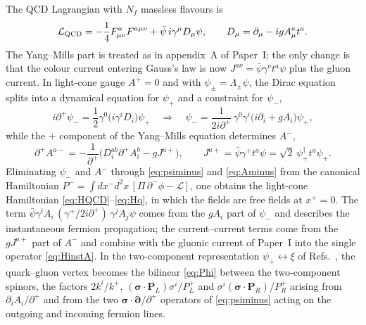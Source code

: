 \documentclass[11pt,a4paper]{article}
\numberwithin{equation}{section}
\newcommand{\dg}{\dagger}
\newcommand{\Nf}{N_{f}}
\begin{document}
The QCD Lagrangian with $\Nf$ massless flavours is
\begin{equation}
\mathcal L_{\rm QCD}=-\frac14F^{a}_{\mu\nu}F^{a\mu\nu}+\bar\psi\,i\gamma^{\mu}D_{\mu}\psi,
\qquad D_{\mu}=\partial_{\mu}-igA^{a}_{\mu}t^{a}.
\label{eq:LQCD}
\end{equation}
The Yang--Mills part is treated as in appendix~A of Paper~I; the only change is that the colour
current entering Gauss's law is now $J^{a\nu}=\bar\psi\gamma^{\nu}t^{a}\psi$ plus the gluon
current. In light-cone gauge $A^{+}=0$ and with $\psi_{\pm}=\Lambda_{\pm}\psi$, the Dirac equation
splits into a dynamical equation for $\psi_{+}$ and a constraint for $\psi_{-}$,
\begin{equation}
i\partial^{+}\psi_{-}=\frac12\gamma^{0}\big(i\gamma^{i}D_{i}\big)\psi_{+}
\quad\Rightarrow\quad
\psi_{-}=\frac{1}{2i\partial^{+}}\,\gamma^{0}\gamma^{i}\big(i\partial_{i}+gA_{i}\big)\psi_{+},
\label{eq:psiminus}
\end{equation}
while the $+$ component of the Yang--Mills equation determines $A^{-}$,
\begin{equation}
\partial^{+}A^{a-}=-\frac{1}{\partial^{+}}\Big(D^{ab}_{i}\partial^{+}A^{b}_{i}-gJ^{a+}\Big),
\qquad J^{a+}=\bar\psi\gamma^{+}t^{a}\psi=\sqrt2\,\psi_{+}^{\dg}t^{a}\psi_{+}.
\label{eq:Aminus}
\end{equation}
Eliminating $\psi_{-}$ and $A^{-}$ through \eqref{eq:psiminus} and \eqref{eq:Aminus} from the
canonical Hamiltonian $P^{-}=\int dx^{-}d^{2}x\,[\Pi\,\partial^{-}\phi-\mathcal L]$, one obtains
\cite{Brodsky:1997de,Zhang:1993dd,Kogut:1969xa} the light-cone Hamiltonian
\eqref{eq:HQCD}--\eqref{eq:Hq}, in which the fields are free fields at $x^{+}=0$. The term
$\bar\psi\gamma^{i}A_{i}\,(\gamma^{+}/2i\partial^{+})\,\gamma^{j}A_{j}\psi$ comes from the
$gA_{i}$ part of $\psi_{-}$ and describes the instantaneous fermion propagation; the current--current
terms come from the $gJ^{a+}$ part of $A^{-}$ and combine with the gluonic current of Paper~I into
the single operator \eqref{eq:HinstA}. In the two-component representation
$\psi_{+}\leftrightarrow\xi$ of Refs.~\cite{Zhang:1993dd,Brodsky:1997de}, the quark--gluon vertex
becomes the bilinear \eqref{eq:Phi} between the two-component spinors, the factors $2k^{i}/k^{+}$,
$(\bm\sigma\!\cdot\!\bm P_{L})\sigma^{i}/P^{+}_{L}$ and $\sigma^{i}(\bm\sigma\!\cdot\!\bm P_{R})/P^{+}_{R}$
arising from $\partial_{i}A_{i}/\partial^{+}$ and from the two $\bm\sigma\!\cdot\!\bm\partial/\partial^{+}$
operators of \eqref{eq:psiminus} acting on the outgoing and incoming fermion lines.
\end{document}
